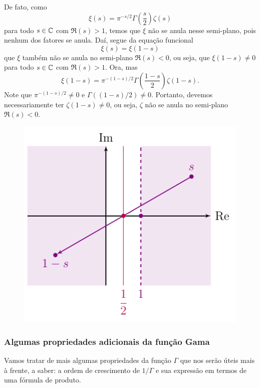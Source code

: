     De fato, como
    \[
    \xi(s) = \pi^{-s/2}\Gamma\left(\frac{s}{2}\right)\zeta(s)
    \]
    para todo $s\in\mathbb{C}$ com $\Re(s)>1$, temos que $\xi$ não se anula nesse semi-plano,
    pois nenhum dos fatores se anula. Daí, segue da equação funcional
    \[
    \xi(s) = \xi(1-s)
    \]
    que $\xi$ também não se anula no semi-plano $\Re(s) < 0$, ou seja, que $\xi(1-s)\neq 0$
    para todo $s\in\mathbb{C}$ com $\Re(s)>1$. Ora, mas
    \[
    \xi(1-s) = \pi^{-(1-s)/2}\Gamma\left(\frac{1-s}{2}\right)\zeta(1-s).
    \]
    Note que $\pi^{-(1-s)/2}\neq 0$ e $\Gamma((1-s)/2)\neq 0$. Portanto, devemos
    necessariamente ter $\zeta(1-s)\neq 0$, ou seja, $\zeta$ não se anula no
    semi-plano $\Re(s) < 0$.
    \begin{figure}[H]\centering
        \includegraphics{Figuras/espelho de s.pdf}
    \end{figure}
    \begin{center}
        
    \end{center}
    
    
    \subsubsection*{Algumas propriedades adicionais da função Gama}
    Vamos tratar de mais algumas propriedades da função $\Gamma$ que nos
    serão úteis mais à frente, a saber: a ordem de crescimento de $1/\Gamma$
    e sua expressão em termos de uma fórmula de produto. 
    
